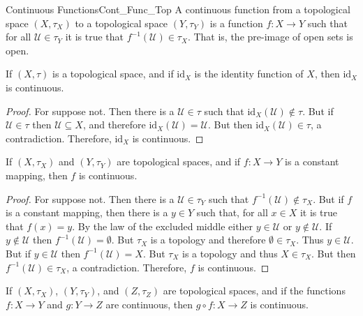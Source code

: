     \begin{fdefinition}{Continuous Functions}{Cont_Func_Top}
        A continuous function from a
        topological space $(X,\tau_{X})$ to a topological space $(Y,\tau_{Y})$
        is a function $f:X\rightarrow{Y}$ such that for all
        $\mathcal{U}\in\tau_{Y}$ it is true that
        $f^{\minus{1}}(\mathcal{U})\in\tau_{X}$. That is, the pre-image of open
        sets is open.
    \end{fdefinition}
    \begin{theorem}
        If $(X,\tau)$ is a topological space, and if $\textrm{id}_{X}$ is the
        identity function of $X$, then $\textrm{id}_{X}$ is continuous.
    \end{theorem}
    \begin{proof}
        For suppose not. Then there is a $\mathcal{U}\in\tau$ such that
        $\textrm{id}_{X}(\mathcal{U})\notin\tau$. But if $\mathcal{U}\in\tau$
        then $\mathcal{U}\subseteq{X}$, and therefore
        $\textrm{id}_{X}(\mathcal{U})=\mathcal{U}$. But then
        $\textrm{id}_{X}(\mathcal{U})\in\tau$, a contradiction. Therefore,
        $\textrm{id}_{X}$ is continuous.
    \end{proof}
    \begin{theorem}
        If $(X,\tau_{X})$ and $(Y,\tau_{Y})$ are topological spaces, and if
        $f:X\rightarrow{Y}$ is a constant mapping, then $f$ is continuous.
    \end{theorem}
    \begin{proof}
        For suppose not. Then there is a $\mathcal{U}\in\tau_{Y}$ such that
        $f^{\minus{1}}(\mathcal{U})\notin\tau_{X}$. But if $f$ is a constant
        mapping, then there is a $y\in{Y}$ such that, for all $x\in{X}$ it is
        true that $f(x)=y$. By the law of the excluded middle either
        $y\in\mathcal{U}$ or $y\notin\mathcal{U}$. If $y\notin\mathcal{U}$ then
        $f^{\minus{1}}(\mathcal{U})=\emptyset$. But $\tau_{X}$ is a topology and
        therefore $\emptyset\in\tau_{X}$. Thus $y\in\mathcal{U}$. But if
        $y\in\mathcal{U}$ then $f^{\minus{1}}(\mathcal{U})=X$. But $\tau_{X}$ is
        a topology and thus $X\in\tau_{X}$. But then
        $f^{\minus{1}}(\mathcal{U})\in\tau_{X}$, a contradiction. Therefore,
        $f$ is continuous.
    \end{proof}
    \begin{theorem}
        If $(X,\tau_{X})$, $(Y,\tau_{Y})$, and $(Z,\tau_{Z})$ are topological
        spaces, and if the functions $f:X\rightarrow{Y}$ and $g:Y\rightarrow{Z}$
        are continuous, then $g\circ{f}:X\rightarrow{Z}$ is continuous.
    \end{theorem}
